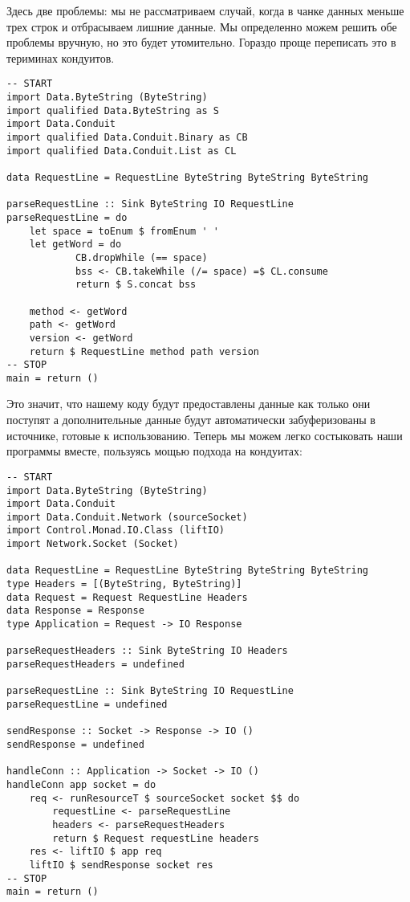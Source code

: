 Здесь две проблемы: мы не рассматриваем случай, когда в чанке данных меньше 
трех строк и отбрасываем лишние данные. Мы определенно можем решить обе 
проблемы вручную, но это будет утомительно. Гораздо проще переписать это 
в териминах кондуитов.
\begin{lstlisting}
-- START
import Data.ByteString (ByteString)
import qualified Data.ByteString as S
import Data.Conduit
import qualified Data.Conduit.Binary as CB
import qualified Data.Conduit.List as CL

data RequestLine = RequestLine ByteString ByteString ByteString

parseRequestLine :: Sink ByteString IO RequestLine
parseRequestLine = do
    let space = toEnum $ fromEnum ' '
    let getWord = do
            CB.dropWhile (== space)
            bss <- CB.takeWhile (/= space) =$ CL.consume
            return $ S.concat bss

    method <- getWord
    path <- getWord
    version <- getWord
    return $ RequestLine method path version
-- STOP
main = return ()
\end{lstlisting}
Это значит, что нашему коду будут предоставлены данные как только они поступят 
а дополнительные данные будут автоматически забуферизованы в источнике, 
готовые к использованию. Теперь мы можем легко состыковать наши программы 
вместе, пользуясь мощью подхода на кондуитах:
\begin{lstlisting}
-- START
import Data.ByteString (ByteString)
import Data.Conduit
import Data.Conduit.Network (sourceSocket)
import Control.Monad.IO.Class (liftIO)
import Network.Socket (Socket)

data RequestLine = RequestLine ByteString ByteString ByteString
type Headers = [(ByteString, ByteString)]
data Request = Request RequestLine Headers
data Response = Response
type Application = Request -> IO Response

parseRequestHeaders :: Sink ByteString IO Headers
parseRequestHeaders = undefined

parseRequestLine :: Sink ByteString IO RequestLine
parseRequestLine = undefined

sendResponse :: Socket -> Response -> IO ()
sendResponse = undefined

handleConn :: Application -> Socket -> IO ()
handleConn app socket = do
    req <- runResourceT $ sourceSocket socket $$ do
        requestLine <- parseRequestLine
        headers <- parseRequestHeaders
        return $ Request requestLine headers
    res <- liftIO $ app req
    liftIO $ sendResponse socket res
-- STOP
main = return ()
\end{lstlisting}
